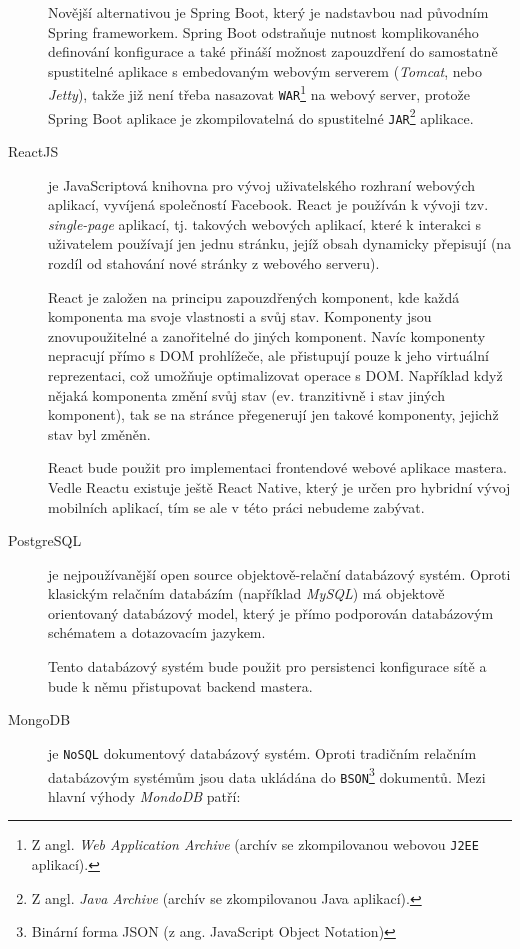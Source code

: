 \begin{description}
    Novější alternativou je Spring Boot, který je nadstavbou nad původním Spring frameworkem. Spring Boot odstraňuje nutnost komplikovaného definování konfigurace a také přináší možnost zapouzdření do samostatně spustitelné aplikace s embedovaným webovým serverem (\textit{Tomcat}, nebo \textit{Jetty}), takže již není třeba nasazovat \texttt{WAR}\footnote{Z angl. \textit{Web Application Archive} (archív se zkompilovanou webovou \texttt{J2EE} aplikací).} na webový server, protože Spring Boot aplikace je zkompilovatelná do spustitelné \texttt{JAR}\footnote{Z angl. \textit{Java Archive} (archív se zkompilovanou Java aplikací).} aplikace.
    
    \item[ReactJS]\label{chap:arch:technologie:react} je JavaScriptová knihovna pro vývoj uživatelského rozhraní webových aplikací, vyvíjená společností Facebook. React je používán k vývoji tzv. \textit{single-page} aplikací, tj. takových webových aplikací, které k interakci s uživatelem používají jen jednu stránku, jejíž obsah dynamicky přepisují (na rozdíl od stahování nové stránky z webového serveru).
    
    React je založen na principu zapouzdřených komponent, kde každá komponenta ma svoje vlastnosti a svůj stav. Komponenty jsou znovupoužitelné a zanořitelné do jiných komponent. Navíc komponenty nepracují přímo s DOM prohlížeče, ale přistupují pouze k jeho virtuální reprezentaci, což umožňuje optimalizovat operace s DOM. Například když nějaká komponenta změní svůj stav (ev. tranzitivně i stav jiných komponent), tak se na stránce přegenerují jen takové komponenty, jejichž stav byl změněn.

    React bude použit pro implementaci frontendové webové aplikace mastera. Vedle Reactu existuje ještě React Native, který je určen pro hybridní vývoj mobilních aplikací, tím se ale v této práci nebudeme zabývat.
    
    \item[PostgreSQL]\label{chap:arch:technologie:postgresql} je nejpoužívanější open source objektově-relační databázový systém. Oproti klasickým relačním databázím (například \textit{MySQL}) má objektově orientovaný databázový model, který je přímo podporován databázovým schématem a dotazovacím jazykem.
    
    Tento databázový systém bude použit pro persistenci konfigurace sítě a bude k němu přistupovat backend mastera.
    
    \item[MongoDB]\label{chap:arch:technologie:mongodb} je \texttt{NoSQL} dokumentový databázový systém. Oproti tradičním relačním databázovým systémům jsou data ukládána do \texttt{BSON}\footnote{Binární forma JSON (z ang. JavaScript Object Notation)} dokumentů. Mezi hlavní výhody \textit{MondoDB} patří:


\end{description}
